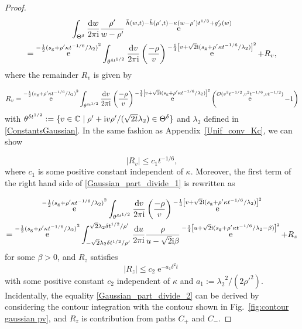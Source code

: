 \documentclass[cmp]{svjour}
\numberwithin{theorem}{section}
\numberwithin{equation}{section}
\DeclareMathOperator{\e}{e}
\def\dd{{\rm d}}
\def\ii{{\rm i}}
\begin{document}
\begin{proof}
\begin{multline}
\label{Gaussian_part_divide_1}
\int_{\Theta^\delta} \frac{\dd w}{2 \pi \ii} \frac{\rho'}{w - \rho'}  \e^{\bar{h}(w,t)-\bar{h}(\rho',t) - \kappa (w - \rho') t^{1/3} + g'_J(w)} \\
= \e^{- \frac{1}{2} {(s_{\rm g} + \rho' \kappa t^{-1/6} / \lambda_2)}^2} \int_{ \theta^{\delta t^{1/2}} } \frac{\dd v}{2 \pi \ii} \left( \frac{-\rho}{v} \right) \e^{ - \frac{1}{4} {\left[ v + \sqrt{2} \ii (s_{\rm g} +\rho' \kappa t^{-1/6} / \lambda_2  )  \right]}^2 } + R_v ,
\end{multline}
where the remainder $R_v$ is given by

\begin{equation*}
R_v = \e^{- \frac{1}{2} {(s_{\rm g} + \rho' \kappa t^{-1/6} / \lambda_2)}^2} \int_{ \theta^{\delta t^{1/2}} } \frac{\dd v}{2 \pi \ii} \left( \frac{- \rho}{v} \right) \e^{ - \frac{1}{4} {\left[ v + \sqrt{2} \ii (s_{\rm g} +\rho' \kappa t^{-1/6} / \lambda_2  )  \right]}^2  } \left( \e^{ \mathcal{O}(v^3 t^{-1/2}, v^2 t^{-1/6}, v t^{-1/2}) } - 1 \right)
\end{equation*}
with $\theta^{\delta t^{1/2}} := \{ v \in \mathbb{C} \mid \rho' + \ii v \rho' / ( \sqrt{2 t} \lambda_2) \in \Theta^\delta \}$ and $\lambda_2$ defined in \eqref{ConstantsGaussian}. In the same fashion as Appendix~\ref{Unif_conv_Kc}, we can show

\begin{equation*}
\label{Upper_bound_vintegral}
|R_v | \leq c_1 t^{-1/6} ,
\end{equation*}
where $c_1$ is some positive constant independent of $\kappa$.
Moreover, the first term of the right hand side of \eqref{Gaussian_part_divide_1} is rewritten as

\begin{multline}
\label{Gaussian_part_divide_2}
\e^{- \frac{1}{2} {(s_{\rm g} + \rho' \kappa t^{-1/6} / \lambda_2)}^2} \int_{ \theta^{\delta t^{1/2}} } \frac{\dd v}{2 \pi \ii}\left( \frac{-\rho}{v} \right) \e^{ - \frac{1}{4} {\left[ v + \sqrt{2} \ii (s_{\rm g} +\rho' \kappa t^{-1/6} / \lambda_2  )  \right]}^2 } \\ =  \e^{- \frac{1}{2} {(s_{\rm g} + \rho' \kappa t^{-1/6} / \lambda_2)}^2}   \int_{- \sqrt{2} \lambda_2 \delta t^{1/2} /\rho' }^{ \sqrt{2} \lambda_2 \delta t^{1/2} / \rho' } \frac{\dd u}{2 \pi \ii} \frac{\rho}{u - \sqrt{2} \ii \beta } \e^{ - \frac{1}{4} {\left[ u + \sqrt{2} \ii (s_{\rm g} + \rho' \kappa t^{-1/6} / \lambda_2 - \beta) \right]}^2 } + R_z
\end{multline}
for some $\beta > 0$, and $R_z$ satisfies
\begin{equation*}
\label{Upper_bound_zintegral}
| R_z | \leq c_2 \e^{- a_1 \delta^2 t }
\end{equation*}
with some positive constant $c_2$ independent of $\kappa$ and $a_1 := {\lambda_2}^2 / (2 {\rho'}^2) $.
Incidentally, the equality \eqref{Gaussian_part_divide_2} can be derived by considering the contour integration with the contour shown in Fig.~\ref{fig:contour gaussian pv}, and $R_z$ is contribution from paths $C_{+}$ and $C_{-}$.



\end{proof}
\end{document}
